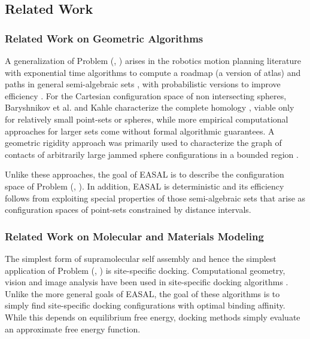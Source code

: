 \subsection{Related Work}
\subsubsection{Related Work on Geometric Algorithms} 
A generalization of Problem (\cone, \ctwo) arises in the robotics motion planning
literature with exponential time algorithms to compute a roadmap (a version of
atlas) and paths in general semi-algebraic sets
\cite{bib:canny-roadmap,canny-alg,basu}, with probabilistic versions to improve
efficiency \cite{kavraki1,kavraki2}. For the Cartesian configuration space of
non intersecting spheres, Baryshnikov et al. and Kahle characterize the
complete homology \cite{Baryshnikov08022013,Kahle2011}, viable only for
relatively small point-sets or spheres, while more empirical computational
approaches for larger sets \cite{PhysRevE,Bubenik10statisticaltopology} come
without formal algorithmic guarantees. A geometric rigidity approach was
primarily used to characterize the graph of contacts of arbitrarily large
jammed sphere configurations in a bounded region
\cite{Kahle2012,Connelly:Jamming}.

Unlike these approaches, the goal of EASAL is to describe the configuration
space of Problem (\cone, \ctwo). In addition, EASAL is
deterministic and its efficiency follows from exploiting special properties of
those semi-algebraic sets that arise as configuration spaces of point-sets
constrained by distance intervals. 

\subsubsection{Related Work on Molecular and Materials Modeling}
\label{ssub:MolecularRelatedWork} 
The simplest form of supramolecular self assembly and hence the simplest
application of Problem (\cone, \ctwo) is site-specific docking. Computational
geometry, vision and image analysis have been used in site-specific docking
algorithms \cite{Bespamyatnikh,Choi2004,pmid1549581,Duhovny2002,pmid15980490}.
Unlike the more general goals of EASAL, the goal of these algorithms is to
simply find site-specific docking configurations with optimal binding affinity.
While this depends on equilibrium free energy, docking methods simply
evaluate an approximate free energy function.

